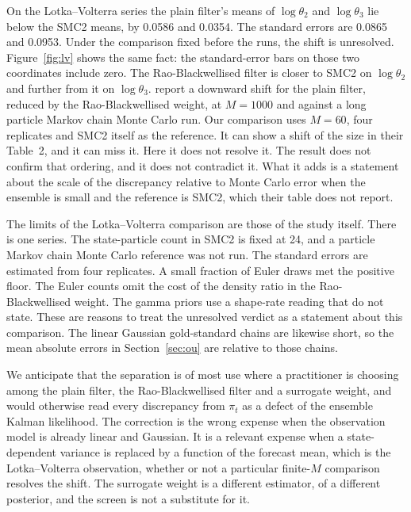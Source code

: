 On the Lotka--Volterra series the plain filter's means of \(\log\theta_2\) and \(\log\theta_3\) lie below the SMC2 means, by 0.0586 and 0.0354. The standard errors are 0.0865 and 0.0953. Under the comparison fixed before the runs, the shift is unresolved. Figure~\ref{fig:lv} shows the same fact: the standard-error bars on those two coordinates include zero. The Rao-Blackwellised filter is closer to SMC2 on \(\log\theta_2\) and further from it on \(\log\theta_3\). \citet{golightly2026} report a downward shift for the plain filter, reduced by the Rao-Blackwellised weight, at \(M = 1000\) and against a long particle Markov chain Monte Carlo run. Our comparison uses \(M = 60\), four replicates and SMC2 itself as the reference. It can show a shift of the size in their Table~2, and it can miss it. Here it does not resolve it. The result does not confirm that ordering, and it does not contradict it. What it adds is a statement about the scale of the discrepancy relative to Monte Carlo error when the ensemble is small and the reference is SMC2, which their table does not report.

The limits of the Lotka--Volterra comparison are those of the study itself. There is one series. The state-particle count in SMC2 is fixed at 24, and a particle Markov chain Monte Carlo reference was not run. The standard errors are estimated from four replicates. A small fraction of Euler draws met the positive floor. The Euler counts omit the cost of the density ratio in the Rao-Blackwellised weight. The gamma priors use a shape-rate reading that \citet{golightly2026} do not state. These are reasons to treat the unresolved verdict as a statement about this comparison. The linear Gaussian gold-standard chains are likewise short, so the mean absolute errors in Section~\ref{sec:ou} are relative to those chains.

We anticipate that the separation is of most use where a practitioner is choosing among the plain filter, the Rao-Blackwellised filter and a surrogate weight, and would otherwise read every discrepancy from \(\pi_t\) as a defect of the ensemble Kalman likelihood. The correction is the wrong expense when the observation model is already linear and Gaussian. It is a relevant expense when a state-dependent variance is replaced by a function of the forecast mean, which is the Lotka--Volterra observation, whether or not a particular finite-\(M\) comparison resolves the shift. The surrogate weight is a different estimator, of a different posterior, and the screen is not a substitute for it.

